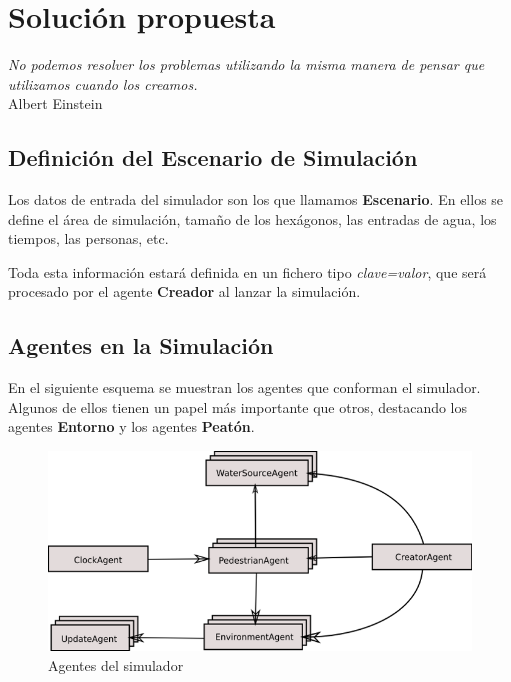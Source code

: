 
\chapter*{Solución propuesta} \label{cap3}

\begin{flushright}
\begin{minipage}{7.85cm}
    {\em No podemos resolver los problemas utilizando la misma manera de pensar
    que utilizamos cuando los creamos.} \\ Albert Einstein
\end{minipage}
\end{flushright}

\vspace*{5mm}

\section*{Definición del Escenario de Simulación}

Los datos de entrada del simulador son los que llamamos {\bf Escenario}. En
ellos se define el área de simulación, tamaño de los hexágonos, las entradas de
agua, los tiempos, las personas, etc.

Toda esta información estará definida en un fichero tipo {\em clave=valor}, que
será procesado por el agente {\bf Creador} al lanzar la simulación.

\section*{Agentes en la Simulación}

En el siguiente esquema se muestran los agentes que conforman el simulador.
Algunos de ellos tienen un papel más importante que otros, destacando los
agentes {\bf Entorno} y los agentes {\bf Peatón}.

\begin{figure}[H]
 \centering
 \includegraphics[width=120mm]{figuras/cap3/agents.png}
 \caption{Agentes del simulador}
\end{figure}

